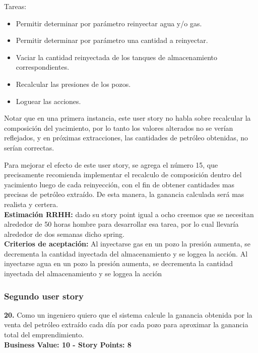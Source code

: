 Tareas:

\begin{itemize}
    \item Permitir determinar por parámetro reinyectar agua y/o gas.
    \item Permitir determinar por parámetro una cantidad a reinyectar.
    \item Vaciar la cantidad reinyectada de los tanques de almacenamiento correspondientes.
    \item Recalcular las presiones de los pozos.
    \item Loguear las acciones.
\end{itemize}

Notar que en una primera instancia, este user story no habla sobre recalcular la composición del yacimiento, por lo tanto los valores alterados no se verían reflejados, y en próximas extracciones, las cantidades de petróleo obtenidas, no serían correctas.

Para mejorar el efecto de este user story, se agrega el número 15, que precisamente recomienda implementar el recalculo de composición dentro del yacimiento luego de cada reinyección, con el fin de obtener cantidades mas precisas de petróleo extraído. De esta manera, la ganancia calculada será mas realista y certera.\\

\textbf{Estimaci\'on RRHH:}
dado su story point igual a ocho creemos que se necesitan alrededor de 50 horas hombre para desarrollar esa tarea, por lo cual llevar\'ia alrededor de dos semanas dicho spring.\\

\textbf{Criterios de aceptaci\'on:}
Al inyectarse gas en un pozo la presi\'on aumenta, se decrementa la cantidad inyectada del almacenamiento y se loggea la acci\'on.
Al inyectarse agua en un pozo la presi\'on aumenta, se decrementa la cantidad inyectada del almacenamiento y se loggea la acci\'on

\subsubsection{Segundo user story}

\textbf{20.} Como un ingeniero quiero que el sistema calcule la ganancia obtenida por la venta del petróleo extraído cada día por cada pozo para aproximar la ganancia total del emprendimiento.\\
\textbf{Business Value: 10 - Story Points: 8}\\

